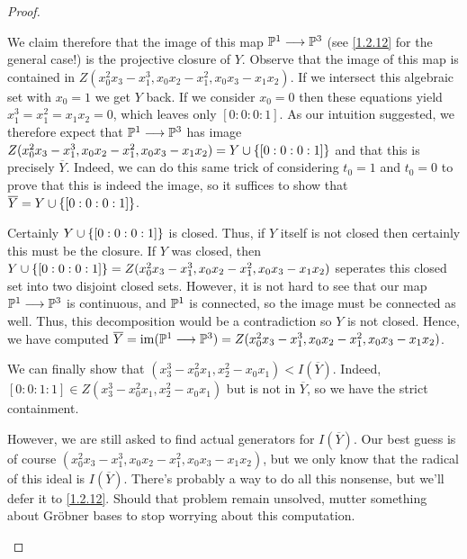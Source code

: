 \begin{proof}
\begin{enumerate}[label= (\alph*)]
        We claim therefore that the image of this map $\P^1 \longrightarrow \P^3$ (see \ref{1.2.12} for the general case!) is the projective closure of $Y$. Observe that the image of this map is contained in $Z(x_0^2 x_3 - x_1^3, x_0 x_2 - x_1^2, x_0 x_3 - x_1 x_2)$. If we intersect this algebraic set with $x_0 = 1$ we get $Y$ back. If we consider $x_0 = 0$ then these equations yield $x_1^3 = x_1^2 = x_1 x_2 = 0$, which leaves only $[0 : 0 : 0 :1]$. As our intuition suggested, we therefore expect that $\P^1 \longrightarrow \P^3$ has image $Z(x_0^2 x_3 - x_1^3, x_0 x_2 - x_1^2, x_0 x_3 - x_1 x_2) = Y \cup \curly{[0 : 0 : 0 : 1]}$ and that this is precisely $\overline Y$. Indeed, we can do this same trick of considering $t_0 = 1$ and $t_0 = 0$ to prove that this is indeed the image, so it suffices to show that $\overline Y = Y \cup \curly{[0 : 0 : 0 :1]}$.

        Certainly $Y \cup \curly{[0 : 0 : 0 : 1]}$ is closed. Thus, if $Y$ itself is not closed then certainly this must be the closure. If $Y$ was closed, then $Y \cup \curly{[0 : 0 : 0 : 1]} = Z(x_0^2 x_3 - x_1^3, x_0 x_2 - x_1^2, x_0 x_3 - x_1 x_2)$ seperates this closed set into two disjoint closed sets. However, it is not hard to see that our map $\P^1 \longrightarrow \P^3$ is continuous, and $\P^1$ is connected, so the image must be connected as well. Thus, this decomposition would be a contradiction so $Y$ is not closed. Hence, we have computed $\overline Y = \im(\P^1 \longrightarrow \P^3) = Z(x_0^2 x_3 - x_1^3, x_0 x_2 - x_1^2, x_0 x_3 - x_1 x_2)$.

        We can finally show that $(x_3^3 - x_0^2 x_1, x_2^2 - x_0 x_1) < I(\overline Y)$. Indeed, $[0 : 0 : 1 : 1] \in Z(x_3^3 - x_0^2 x_1, x_2^2 - x_0 x_1)$ but is not in $\overline Y$, so we have the strict containment.

        However, we are still asked to find actual generators for $I(\overline Y)$. Our best guess is of course $(x_0^2 x_3 - x_1^3, x_0 x_2 - x_1^2, x_0 x_3 - x_1 x_2)$, but we only know that the radical of this ideal is $I(\overline Y)$. There's probably a way to do all this nonsense, but we'll defer it to \ref{1.2.12}. Should that problem remain unsolved, mutter something about Gr\"obner bases to stop worrying about this computation.
    \end{enumerate}
\end{proof}
